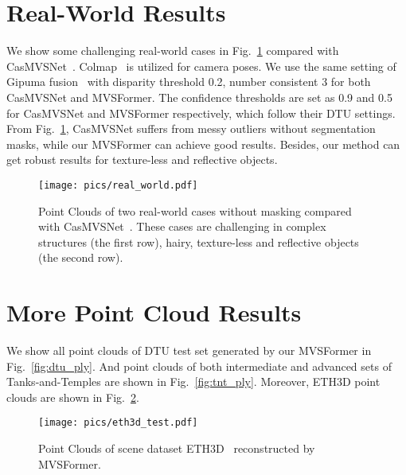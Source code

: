 \documentclass[10pt]{article} \usepackage[preprint]{tmlr}
\begin{document}
 
\section{Real-World Results}

We show some challenging real-world cases in Fig.~\ref{fig:real-world} compared with CasMVSNet~\citep{gu2020cascade}. Colmap~\citep{schonberger2016pixelwise} is utilized for camera poses. We use the same setting of Gipuma fusion~\citep{Galliani_2015_ICCV} with disparity threshold 0.2, number consistent 3 for both CasMVSNet and MVSFormer. The confidence thresholds are set as 0.9 and 0.5 for CasMVSNet and MVSFormer respectively, which follow their DTU settings. 
From Fig.~\ref{fig:real-world}, CasMVSNet suffers from messy outliers without segmentation masks, while our MVSFormer can achieve good results. Besides, our method can get robust results for texture-less and reflective objects.

\begin{figure}[h]
\begin{centering}
\texttt{[image: pics/real\_world.pdf]}
\par\end{centering}
\caption{Point Clouds of two real-world cases without masking compared with CasMVSNet~\citep{gu2020cascade}. These cases are challenging in complex structures (the first row), hairy, texture-less and reflective objects (the second row).}
\label{fig:real-world}
 \vspace{-0.1in}
\end{figure}

\section{More Point Cloud Results}

We show all point clouds of DTU test set generated by our MVSFormer in Fig.~\ref{fig:dtu_ply}. And point clouds of both intermediate and advanced sets of Tanks-and-Temples are shown in Fig.~\ref{fig:tnt_ply}. 
Moreover, ETH3D point clouds are shown in Fig.~\ref{fig:eth3d_ply}.

\begin{figure}
\begin{centering}
\texttt{[image: pics/eth3d\_test.pdf]} 
\par\end{centering}
\caption{Point Clouds of scene dataset ETH3D~\citep{schops2017multi} reconstructed by MVSFormer.}
\label{fig:eth3d_ply}
\vspace{-0.1in}
\end{figure}
\end{document}
